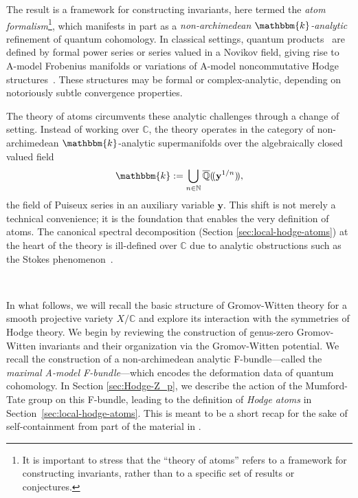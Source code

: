 \documentclass[12pt,a4paper]{amsart}
\theoremstyle{definition}
\theoremstyle{remark}
\newcommand{\C}{\mathbb{C}}
\begin{document}
The result is a framework for constructing invariants, here termed the \emph{atom formalism}\footnote{It is important to stress that the ``theory of atoms'' refers to a framework for constructing invariants, rather than to a specific set of results or conjectures.}, which manifests in part as a \emph{non-archimedean $\mathbbm{k}$-analytic} refinement of quantum cohomology. In classical settings, quantum products~\cite{Kontsevich1994} are defined by formal power series or series valued in a Novikov field, giving rise to A-model Frobenius manifolds or variations of A-model noncommutative Hodge structures~\cites{KatzarkovKontsevichPantev2008, CSabbah}. These structures may be formal or complex-analytic, depending on notoriously subtle convergence properties.

The theory of atoms circumvents these analytic challenges through a change of setting. Instead of working over $\C$, the theory operates in the category of non-archimedean $\mathbbm{k}$-analytic supermanifolds over the algebraically closed valued field
\[
\mathbbm{k} := \bigcup_{n \in \mathbb{N}} \overline{\mathbb{Q}}(\!(\mathbf{y}^{1/n})\!),
\]
the field of Puiseux series in an auxiliary variable $\mathbf{y}$. This shift is not merely a technical convenience; it is the foundation that enables the very definition of atoms. The canonical spectral decomposition (Section \ref{sec:local-hodge-atoms}) at the heart of the theory is ill-defined over $\C$ due to analytic obstructions such as the Stokes phenomenon~\cite{KatzarkovKontsevichPantev2008}.

\ 

In what follows, we will recall the basic structure of Gromov-Witten theory for a smooth projective variety $X/\C$ and explore its interaction with the symmetries of Hodge theory. We begin by reviewing the construction of genus-zero Gromov-Witten invariants and their organization via the Gromov-Witten potential. We recall the construction of a non-archimedean analytic F-bundle---called the \emph{maximal A-model F-bundle}---which encodes the deformation data of quantum cohomology. In Section \ref{sec:Hodge-Z_p}, we describe the action of the Mumford-Tate group on this F-bundle, leading to the definition of \emph{Hodge atoms} in Section~\ref{sec:local-hodge-atoms}. This is meant to be a short recap for the sake of self-containment from part of the material in \cite{katzarkovpantevyu}. 
\end{document}
